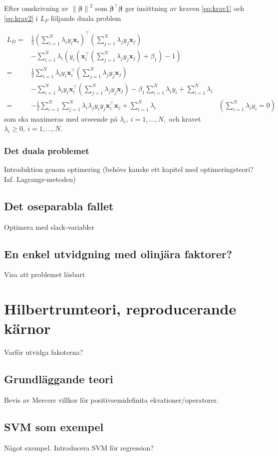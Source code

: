 \documentclass[a4paper, 12pt]{report}
\theoremstyle{definition}
\theoremstyle{remark}
\newcommand{\bfbeta}{{\boldsymbol{\beta}}}
\begin{document}
Efter omskrivning av $\left\| \bfbeta \right\|^2$ som $\bfbeta^\intercal\bfbeta$ ger insättning av kraven \ref{eq:krav1} och \ref{eq:krav2} i $L_P$ följande duala problem

\begin{equation*}
\begin{aligned}
	L_D=&\frac{1}{2}\left(\sum_{i=1}^{N}\lambda_i y_i \mathbf{x}_i\right)^\intercal \left(\sum_{j=1}^{N}\lambda_j y_j \mathbf{x}_j\right)&\\
	&- \sum_{i=1}^{N}\lambda_i \left(y_i\left(\mathbf{x}_i^\intercal \left(\sum_{j=1}^{N} \lambda_j y_j \mathbf{x}_j\right) +\beta_1 \right) -1\right)&\\
	=& \frac{1}{2} \sum_{i=1}^{N} \lambda_i y_i \mathbf{x}_i^\intercal\left(\sum_{j=1}^{N} \lambda_j y_j \mathbf{x}_j\right) &\\
	&- \sum_{i=1}^{N}\lambda_i y_i \mathbf{x}_i^\intercal \left(\sum_{j=1}^{N} \lambda_j y_j \mathbf{x}_j\right) - \beta_1 \sum_{i=1}^{N} \lambda_i y_i  + \sum_{i=1}^{N} \lambda_i&\\
	=& -\frac{1}{2} \sum_{i=1}^{N} \sum_{j=1}^{N} \lambda_i \lambda_j y_i y_j \mathbf{x}_i^\intercal \mathbf{x}_j + \sum_{i=1}^{N} \lambda_i &\textstyle{\left(\sum\limits_{i=1}^{N}\lambda_iy_i = 0\right)}
\end{aligned}
\end{equation*}
som ska maximeras med avseende på $\lambda_i,~i=1,\dots,N,$ och kravet $\lambda_i\geq 0,~i=1,\dots,N$.

\subsection{Det duala problemet}


Introduktion genom optimering (behövs kanske ett kapitel med optimeringsteori? Iaf. Lagrange-metoden)
\section{Det oseparabla fallet}
Optimera med slack-variabler
\section{En enkel utvidgning med olinjära faktorer?}
Visa att problemet lösbart
\chapter{Hilbertrumteori, reproducerande kärnor}\label{chap:hilbert}
Varför utvidga fakoterna?
\section{Grundläggande teori}
Bevis av Mercers villkor för positivsemidefinita ekvationer/operatorer.
\section{SVM som exempel}
Något exempel. Introducera SVM för regression?



\end{document}
